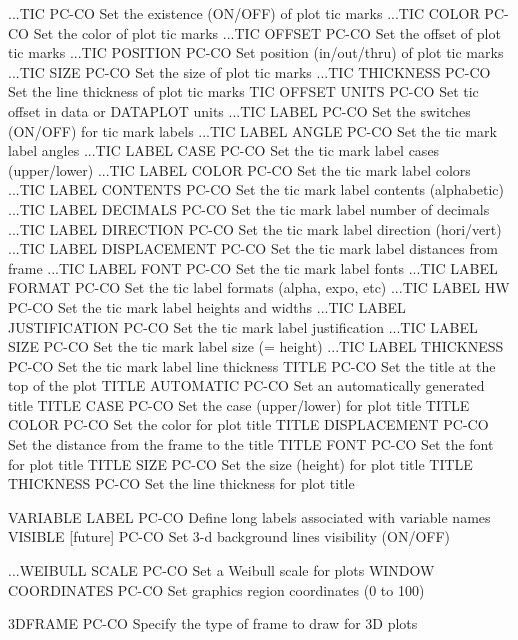 ...TIC                      PC-CO Set the existence (ON/OFF) of plot tic marks
...TIC COLOR                PC-CO Set the color of plot tic marks
...TIC OFFSET               PC-CO Set the offset of plot tic marks
...TIC POSITION             PC-CO Set position (in/out/thru) of plot tic marks
...TIC SIZE                 PC-CO Set the size of plot tic marks
...TIC THICKNESS            PC-CO Set the line thickness of plot tic marks
TIC OFFSET UNITS            PC-CO Set tic offset in data or DATAPLOT units
...TIC LABEL                PC-CO Set the switches (ON/OFF) for tic mark labels
...TIC LABEL ANGLE          PC-CO Set the tic mark label angles
...TIC LABEL CASE           PC-CO Set the tic mark label cases (upper/lower)
...TIC LABEL COLOR          PC-CO Set the tic mark label colors
...TIC LABEL CONTENTS       PC-CO Set the tic mark label contents (alphabetic)
...TIC LABEL DECIMALS       PC-CO Set the tic mark label number of decimals
...TIC LABEL DIRECTION      PC-CO Set the tic mark label direction (hori/vert)
...TIC LABEL DISPLACEMENT   PC-CO Set the tic mark label distances from frame
...TIC LABEL FONT           PC-CO Set the tic mark label fonts
...TIC LABEL FORMAT         PC-CO Set the tic label formats (alpha, expo, etc)
...TIC LABEL HW             PC-CO Set the tic mark label heights and widths
...TIC LABEL JUSTIFICATION  PC-CO Set the tic mark label justification
...TIC LABEL SIZE           PC-CO Set the tic mark label size (= height)
...TIC LABEL THICKNESS      PC-CO Set the tic mark label line thickness
TITLE                       PC-CO Set the title at the top of the plot
TITLE AUTOMATIC             PC-CO Set an automatically generated title
TITLE CASE                  PC-CO Set the case (upper/lower) for plot title
TITLE COLOR                 PC-CO Set the color for plot title
TITLE DISPLACEMENT          PC-CO Set the distance from the frame to the title
TITLE FONT                  PC-CO Set the font for plot title
TITLE SIZE                  PC-CO Set the size (height) for plot title
TITLE THICKNESS             PC-CO Set the line thickness for plot title

VARIABLE LABEL              PC-CO Define long labels associated with variable names
VISIBLE    [future]         PC-CO Set 3-d background lines visibility (ON/OFF)

...WEIBULL SCALE            PC-CO Set a Weibull scale for plots
WINDOW COORDINATES          PC-CO Set graphics region coordinates (0 to 100)

3DFRAME                     PC-CO Specify the type of frame to draw for 3D plots

